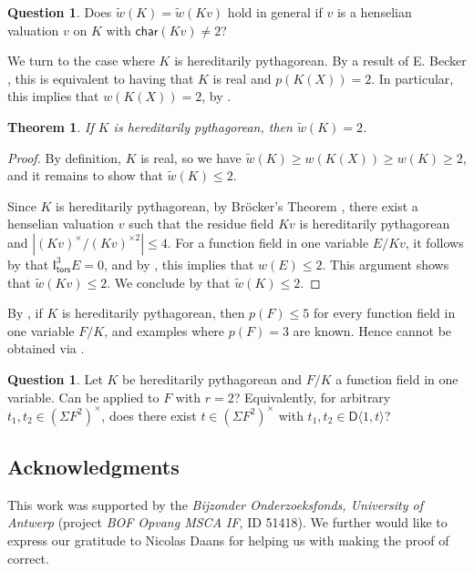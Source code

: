 \documentclass[twoside,11pt]{amsart}
\numberwithin{equation}{section}
\newtheorem{thm}[equation]{Theorem}
\theoremstyle{definition}
\newtheorem{qu}[equation]{Question}
\newcommand{\car}{\mathsf{char}}
\newcommand{\mg}[1]{{#1}^{\times}}
\newcommand{\sq}[1]{{#1}^{\times 2}}
\newcommand{\scg}[1]{\mg{#1}/\sq{#1}}
\newcommand{\la}{\langle}
\newcommand{\ra}{\rangle}
\renewcommand{\leq}{\leqslant}
\renewcommand{\geq}{\geqslant}
\newcommand{\tors}{\mathsf{tors}}
\newcommand{\I}{\mathsf{I}}
\renewcommand{\leq}{\leqslant}
\renewcommand{\geq}{\geqslant}
\newcommand{\D}{\mathsf{D}}
\newcommand{\wt}{\widetilde}
\begin{document}
\begin{qu}
Does $\wt{w}(K)=\wt{w}(Kv)$ hold in general if $v$ is a henselian valuation $v$ on $K$ with $\car(Kv)\neq 2$?
\end{qu}

We turn to the case where $K$ is hereditarily pythagorean.
By a result of E. Becker \cite[Chap.~III, Theorem 4]{Bec78}, this is equivalent to having that $K$ is real and $p(K(X))=2$.
In particular, this implies that $w(K(X))= 2$, by .

\begin{thm}\label{main}
    If $K$ is hereditarily pythagorean, then $\wt{w}(K)=2$.
    
\end{thm}
\begin{proof}
By definition, $K$ is real, so we have $\wt{w}(K)\geq w(K(X))\geq w(K)\geq 2$, and it remains to show that $\wt{w}(K)\leq 2$.

Since $K$ is hereditarily pythagorean, by Br\"ocker's Theorem \cite[Prop.~3.5]{Bro76}, there exist a henselian valuation $v$ such that the residue field $Kv$ is hereditarily pythagorean and $|\scg{(Kv)}|\leq 4$. 
  For a function field in one variable $E/Kv$, it follows by \cite[Theorem 6.6]{BDGMZ23} that $\I^3_\tors E=0$, and by , this implies that $w(E)\leq 2$. 
  This argument shows that $\wt{w}(Kv)\leq 2$.
  We conclude by  that $\wt{w}(K)\leq 2$. 
\end{proof}

By \cite[Theorem 1.6]{BDGMZ23}, if $K$ is hereditarily pythagorean, then $p(F)\leq 5$ for every function field in one variable $F/K$, and examples where $p(F)=3$ are known.
Hence  cannot be obtained via .

\begin{qu}
Let $K$ be hereditarily pythagorean and $F/K$ a function field in one variable.
Can  be applied to $F$ with $r=2$? 
Equivalently, for arbitrary $t_1,t_2\in\mg{(\mathsf{\Sigma}F^2)}$, does there exist $t\in\mg{(\mathsf{\Sigma}F^2)}$ with $t_1,t_2\in\D\la 1,t\ra$?
\end{qu}  

\subsection*{Acknowledgments}
This work was supported by the \emph{Bijzonder Onderzoeksfonds, University of Antwerp} (project \emph{BOF Opvang MSCA IF}, ID 51418). We further would like to express our gratitude to Nicolas Daans for helping us with making the proof of  correct.
\end{document}
